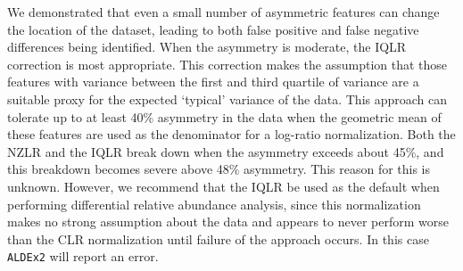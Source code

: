\documentclass[graybox]{svmult}
\begin{document}
We demonstrated that even a small number of asymmetric features can change the location of the dataset, leading to both false positive and false negative differences being identified. When the asymmetry is moderate, the IQLR correction is most appropriate. This correction makes the assumption that those features with variance between the first and third quartile of variance are a suitable proxy for the expected `typical' variance of the data. This approach can tolerate up to at least 40\% asymmetry in the data when the geometric mean of these features are used as the denominator for a log-ratio normalization. Both the NZLR and the IQLR break down when the asymmetry exceeds about 45\%, and this breakdown becomes severe above 48\% asymmetry. This reason for this is unknown. However, we recommend that the IQLR be used as the default when performing differential relative abundance analysis, since this normalization makes no strong assumption about the data and appears to never perform worse than the CLR normalization until failure of the approach occurs. In this case \texttt{ALDEx2} will report an error.
\end{document}
